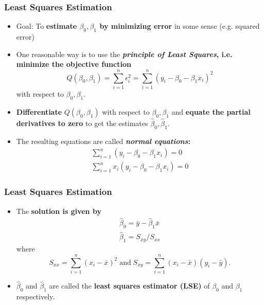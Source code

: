 \documentclass[10pt]{beamer} %
\begin{document}
\begin{frame}
	\frametitle{Least Squares Estimation}
	\begin{itemize}
		\item Goal: To \textbf{estimate $\beta_0,\beta_1$ by minimizing error} in some sense (e.g. squared error)
		\bigskip
		\item One reasonable way is to use the \textbf{\emph{principle of Least Squares}, i.e. minimize the objective function}
		$$Q(\beta_0,\beta_1) = \sum_{i=1}^n \epsilon_i^2 = \sum_{i=1}^n (y_i - \beta_0 - \beta_1x_i)^2$$
		with respect to $\beta_0,\beta_1$.
	\end{itemize}
	
	
	\begin{itemize}
		\item \textbf{Differentiate} $Q(\beta_0,\beta_1)$ with respect to $\beta_0,\beta_1$ and \textbf{equate the partial derivatives to zero} to get the estimates $\hat\beta_0,\hat\beta_1$.
		\bigskip
		\item The resulting equations are called \textbf{\emph{normal equations}:}
		\begin{eqnarray*}
			\sum_{i=1}^n (y_i - \beta_0 - \beta_1x_i) = 0 \\
			\sum_{i=1}^n x_i(y_i - \beta_0 - \beta_1x_i) = 0
		\end{eqnarray*}
	\end{itemize}
		
	
\end{frame}


\begin{frame}
	\frametitle{Least Squares Estimation}
	\begin{itemize}
		\item The \textbf{solution is given by}
		\begin{eqnarray*}
			\hat\beta_0 = \bar y - \hat\beta_1\bar x \\
			\hat\beta_1 = S_{xy}/S_{xx}
		\end{eqnarray*}
		where
		$$S_{xx} = \sum_{i=1}^n (x_i - \bar x)^2\; \textrm{and}\; S_{xy} = \sum_{i=1}^n (x_i - \bar x)(y_i - \bar y).$$
		\item $\hat\beta_0$ and $\hat\beta_1$ are called the \textbf{least squares estimator (LSE)} of $\beta_0$ and $\beta_1$ respectively.
	\end{itemize}	
	
\end{frame}
\end{document}
